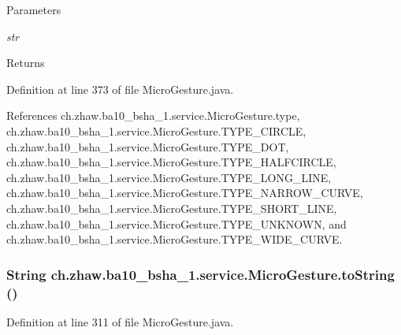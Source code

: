 \begin{DoxyParams}{Parameters}
\item[{\em str}]\end{DoxyParams}
\begin{DoxyReturn}{Returns}

\end{DoxyReturn}


Definition at line 373 of file MicroGesture.java.

References ch.zhaw.ba10\_\-bsha\_\-1.service.MicroGesture.type, ch.zhaw.ba10\_\-bsha\_\-1.service.MicroGesture.TYPE\_\-CIRCLE, ch.zhaw.ba10\_\-bsha\_\-1.service.MicroGesture.TYPE\_\-DOT, ch.zhaw.ba10\_\-bsha\_\-1.service.MicroGesture.TYPE\_\-HALFCIRCLE, ch.zhaw.ba10\_\-bsha\_\-1.service.MicroGesture.TYPE\_\-LONG\_\-LINE, ch.zhaw.ba10\_\-bsha\_\-1.service.MicroGesture.TYPE\_\-NARROW\_\-CURVE, ch.zhaw.ba10\_\-bsha\_\-1.service.MicroGesture.TYPE\_\-SHORT\_\-LINE, ch.zhaw.ba10\_\-bsha\_\-1.service.MicroGesture.TYPE\_\-UNKNOWN, and ch.zhaw.ba10\_\-bsha\_\-1.service.MicroGesture.TYPE\_\-WIDE\_\-CURVE.\hypertarget{classch_1_1zhaw_1_1ba10__bsha__1_1_1service_1_1MicroGesture_adbf2189c0f8d6737493978f765e73fe0}{
\subsubsection[{toString}]{\setlength{\rightskip}{0pt plus 5cm}String ch.zhaw.ba10\_\-bsha\_\-1.service.MicroGesture.toString ()}}
\label{classch_1_1zhaw_1_1ba10__bsha__1_1_1service_1_1MicroGesture_adbf2189c0f8d6737493978f765e73fe0}


Definition at line 311 of file MicroGesture.java.

